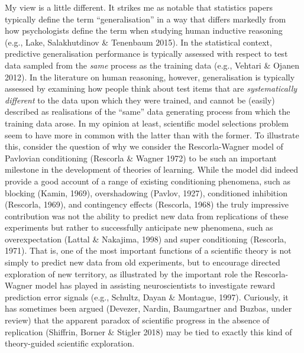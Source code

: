 \documentclass[doc]{apa6}
\theoremstyle{definition}
\theoremstyle{definition}
\theoremstyle{definition}
\theoremstyle{remark}
\begin{document}
My view is a little different. It strikes me as notable that statistics
papers typically define the term \enquote{generalisation} in a way that
differs markedly from how psychologists define the term when studying
human inductive reasoning (e.g., Lake, Salakhutdinov \& Tenenbaum 2015).
In the statistical context, predictive generalisation performance is
typically assessed with respect to test data sampled from the
\emph{same} process as the training data (e.g., Vehtari \& Ojanen 2012).
In the literature on human reasoning, however, generalisation is
typically assessed by examining how people think about test items that
are \emph{systematically different} to the data upon which they were
trained, and cannot be (easily) described as realisations of the
\enquote{same} data generating process from which the training data
arose. In my opinion at least, scientific model selections problem seem
to have more in common with the latter than with the former. To
illustrate this, consider the question of why we consider the
Rescorla-Wagner model of Pavlovian conditioning (Rescorla \& Wagner
1972) to be such an important milestone in the development of theories
of learning. While the model did indeed provide a good account of a
range of existing conditioning phenomena, such as blocking (Kamin,
1969), overshadowing (Pavlov, 1927), conditioned inhibition (Rescorla,
1969), and contingency effects (Rescorla, 1968) the truly impressive
contribution was not the ability to predict new data from replications
of these experiments but rather to successfully anticipate new
phenomena, such as overexpectation (Lattal \& Nakajima, 1998) and super
conditioning (Rescorla, 1971). That is, one of the most important
functions of a scientific theory is not simply to predict new data from
old experiments, but to encourage directed exploration of new territory,
as illustrated by the important role the Rescorla-Wagner model has
played in assisting neuroscientists to investigate reward prediction
error signals (e.g., Schultz, Dayan \& Montague, 1997). Curiously, it
has sometimes been argued (Devezer, Nardin, Baumgartner and Buzbas,
under review) that the apparent paradox of scientific progress in the
absence of replication (Shiffrin, Borner \& Stigler 2018) may be tied to
exactly this kind of theory-guided scientific exploration.
\end{document}
